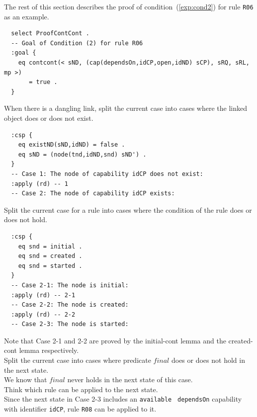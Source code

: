 \documentclass[12pt]{report}
\begin{document}
The rest of this section describes the proof of condition~(\ref{exp:cond2})
for rule {\tt R06} as an example.
\small
\begin{verbatim}
  select ProofContCont .
  -- Goal of Condition (2) for rule R06
  :goal {
    eq contcont(< sND, (cap(dependsOn,idCP,open,idND) sCP), sRQ, sRL, mp >)
       = true .
  }
\end{verbatim}
\normalsize

 When there is a dangling link, split the
current case into cases where the linked object does or does not
exist.
\small
\begin{verbatim}
  :csp {
    eq existND(sND,idND) = false .
    eq sND = (node(tnd,idND,snd) sND') .
  }
  -- Case 1: The node of capability idCP does not exist:
  :apply (rd) -- 1
  -- Case 2: The node of capability idCP exists:
\end{verbatim}
\normalsize

 Split the current case for a rule into
cases where the condition of the rule does or does not hold.
\small
\begin{verbatim}
  :csp {
    eq snd = initial .
    eq snd = created .
    eq snd = started .
  }
  -- Case 2-1: The node is initial:
  :apply (rd) -- 2-1
  -- Case 2-2: The node is created:
  :apply (rd) -- 2-2
  -- Case 2-3: The node is started:
\end{verbatim}
\normalsize
Note that Case 2-1 and 2-2 are proved by the initial-cont lemma and
the created-cont lemma respectively.\\

 Split the current case into cases where
predicate $final$ does or does not hold in the next state.\\
We know that $final$ never holds in the next state of this case.\\

 Think which rule can be applied to the next
state. \\
Since the next state in Case 2-3 includes an {\tt available} {\tt
  dependsOn} capability with identifier {\tt idCP}, rule {\tt R08} can
be applied to it.\\
\end{document}
